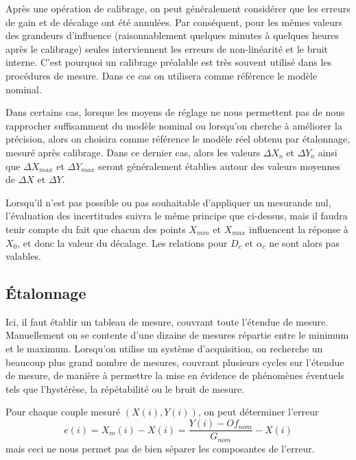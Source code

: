 Après une opération de calibrage, on peut généralement considérer que les erreurs de gain et de décalage ont été annulées. Par conséquent, pour les mêmes valeurs des grandeurs d'influence (raisonnablement quelques minutes à quelques heures après le calibrage) seules interviennent les erreurs de non-linéarité et le bruit interne. C'est pourquoi un calibrage préalable est très souvent utilisé dans les procédures de mesure. Dans ce cas on utilisera comme référence le modèle nominal.

Dans certains cas, lorsque les moyens de réglage ne nous permettent pas de nous rapprocher suffisamment du modèle nominal ou lorsqu'on cherche à améliorer la précision, alors on choisira comme référence le modèle réel obtenu par étalonnage, mesuré après calibrage. Dans ce dernier cas, alors les valeurs $\Delta X_{o}$ et $\Delta Y_{o}$ ainsi que $\Delta X_{max}$ et $\Delta Y_{max}$ seront généralement établies autour des valeurs moyennes de $\Delta X$ et $\Delta Y$.

Lorsqu'il n'est pas possible ou pas souhaitable d'appliquer un mesurande nul, l'évaluation des incertitudes suivra le même principe que ci-dessus, mais il faudra tenir compte du fait que chacun des points $X_{min}$ et $X_{max}$ influencent la réponse à $X_{0}$, et donc la valeur du décalage. Les relations pour $D_{c}$ et $\alpha_{c}$ ne sont alors pas valables.

\subsection{Étalonnage}

Ici, il faut établir un tableau de mesure, couvrant toute l'étendue de mesure. Manuellement on se contente d'une dizaine de mesures répartie entre le minimum et le maximum. Lorsqu'on utilise un système d'acquisition, on recherche un beaucoup plus grand nombre de mesures, couvrant plusieurs cycles sur l'étendue de mesure, de manière à permettre la mise en évidence de phénomènes éventuels tels que l'hystérèse, la répétabilité ou le bruit de mesure.

Pour chaque couple mesuré $(X(i), Y(i))$, on peut déterminer l'erreur
\[
e(i) = X_m(i) - X(i) = \frac{Y(i) - Of_{nom}}{G_{nom}}   -X(i)
\]
mais ceci ne nous permet pas de bien séparer les composantes de l'erreur.

